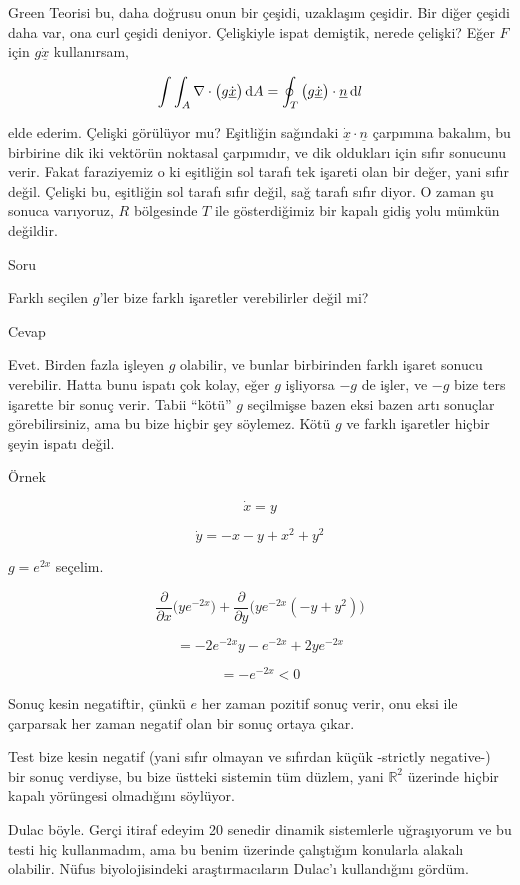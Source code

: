 \documentclass[12pt,fleqn]{article}\usepackage{../../common}
\begin{document}
Green Teorisi bu, daha doğrusu onun bir çeşidi, uzaklaşım çeşidir. Bir diğer
çeşidi daha var, ona curl çeşidi deniyor. Çelişkiyle ispat demiştik, nerede
çelişki? Eğer $F$ için $g \dot{\underline{x}}$ kullanırsam, 

$$
\int \int_{A} \nabla \cdot \big( g \dot{\underline{x}} \big) \,\mathrm{d} A =
\oint_T  \big( g \dot{\underline{x}} \big)  \cdot \underline{n} \,\mathrm{d} l
$$

elde ederim. Çelişki görülüyor mu? Eşitliğin sağındaki $\dot{\underline{x}}
\cdot \underline{n}$ çarpımına bakalım, bu birbirine dik iki vektörün noktasal
çarpımıdır, ve dik oldukları için sıfır sonucunu verir. Fakat faraziyemiz o ki
eşitliğin sol tarafı tek işareti olan bir değer, yani sıfır değil. Çelişki bu,
eşitliğin sol tarafı sıfır değil, sağ tarafı sıfır diyor. O zaman şu sonuca
varıyoruz, $R$ bölgesinde $T$ ile gösterdiğimiz bir kapalı gidiş yolu mümkün
değildir.

Soru

Farklı seçilen $g$'ler bize farklı işaretler verebilirler değil mi?

Cevap

Evet. Birden fazla işleyen $g$ olabilir, ve bunlar birbirinden farklı işaret
sonucu verebilir. Hatta bunu ispatı çok kolay, eğer $g$ işliyorsa $-g$ de işler,
ve $-g$ bize ters işarette bir sonuç verir. Tabii ``kötü'' $g$ seçilmişse bazen
eksi bazen artı sonuçlar görebilirsiniz, ama bu bize hiçbir şey söylemez. Kötü
$g$ ve farklı işaretler hiçbir şeyin ispatı değil. 

Örnek

$$ \dot{x} = y $$

$$ \dot{y} = -x -y +x^2 + y^2 $$

$g=e^{2x}$ seçelim. 

$$
\frac{\partial }{\partial x} \big( y e^{-2x} \big) +
\frac{\partial }{\partial y} \big( y e^{-2x} (-y+y^2) \big) 
$$


$$ = -2 e^{-2x}y - e^{-2x} + 2y e^{-2x}$$

$$ =  - e^{-2x} < 0$$

Sonuç kesin negatiftir, çünkü $e$ her zaman pozitif sonuç verir, onu eksi ile
çarparsak her zaman negatif olan bir sonuç ortaya çıkar.

Test bize kesin negatif (yani sıfır olmayan ve sıfırdan küçük -strictly
negative-) bir sonuç verdiyse, bu bize üstteki sistemin tüm düzlem, yani
$\mathbb{R}^2$ üzerinde hiçbir kapalı yörüngesi olmadığını söylüyor.

Dulac böyle. Gerçi itiraf edeyim 20 senedir dinamik sistemlerle uğraşıyorum ve
bu testi hiç kullanmadım, ama bu benim üzerinde çalıştığım konularla alakalı
olabilir. Nüfus biyolojisindeki araştırmacıların Dulac'ı kullandığını gördüm.
\end{document}
